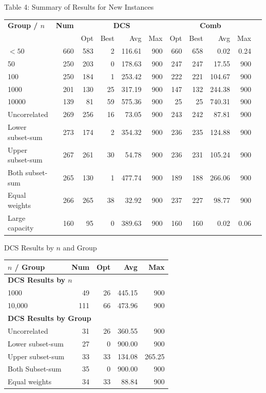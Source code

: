 \documentclass[fleqn,11pt,aspectratio=43]{beamer}
\begin{document}
\begin{frame}{Table 4: Summary of Results for New Instances}
\scriptsize
\begin{tabularx}{\textwidth}{l r r r r r r r r r r}
\textbf{Group / $n$} & \textbf{Num} & \multicolumn{4}{c}{\textbf{DCS}} & \multicolumn{4}{c}{\textbf{Comb}} \\
& & Opt & Best & Avg & Max & Opt & Best & Avg & Max \\
\hline
$< 50$             & 660 & 583 & 2  & 116.61 & 900 & 660 & 658 & 0.02 & 0.24 \\
50                 & 250 & 203 & 0  & 178.63 & 900 & 247 & 247 & 17.55 & 900 \\
100                & 250 & 184 & 1  & 253.42 & 900 & 222 & 221 & 104.67 & 900 \\
1000               & 201 & 130 & 25 & 317.19 & 900 & 147 & 132 & 244.38 & 900 \\
10000              & 139 & 81  & 59 & 575.36 & 900 & 25  & 25  & 740.31 & 900 \\
\hline
Uncorrelated       & 269 & 256 & 16 & 73.05  & 900 & 243 & 242 & 87.81  & 900 \\
Lower subset-sum   & 273 & 174 & 2  & 354.32 & 900 & 236 & 235 & 124.88 & 900 \\
Upper subset-sum   & 267 & 261 & 30 & 54.78  & 900 & 236 & 231 & 105.24 & 900 \\
Both subset-sum    & 265 & 130 & 1  & 477.74 & 900 & 189 & 188 & 266.06 & 900 \\
Equal weights      & 266 & 265 & 38 & 32.92  & 900 & 237 & 227 & 98.77  & 900 \\
Large capacity     & 160 & 95  & 0  & 389.63 & 900 & 160 & 160 & 0.02   & 0.06 \\
\end{tabularx}
\end{frame}


\begin{frame}{DCS Results by $n$ and Group}
\scriptsize
\begin{tabularx}{\textwidth}{l r r r r}
\textbf{$n$ / Group} & \textbf{Num} & \textbf{Opt} & \textbf{Avg} & \textbf{Max} \\
\hline
\multicolumn{5}{l}{\textbf{DCS Results by $n$}} \\
1000         & 49  & 26 & 445.15 & 900 \\
10,000       & 111 & 66 & 473.96 & 900 \\
\hline
\multicolumn{5}{l}{\textbf{DCS Results by Group}} \\
Uncorrelated       & 31 & 26 & 360.55 & 900 \\
Lower subset-sum   & 27 & 0  & 900.00 & 900 \\
Upper subset-sum   & 33 & 33 & 134.08 & 265.25 \\
Both Subset-sum    & 35 & 0  & 900.00 & 900 \\
Equal weights      & 34 & 33 & 88.84  & 900 \\
\end{tabularx}
\end{frame}
\end{document}
